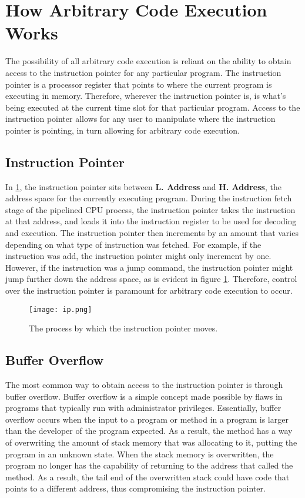 \section{How Arbitrary Code Execution Works}

The possibility of all arbitrary code execution is reliant on the ability to obtain access to the instruction pointer for any particular program. The instruction pointer is a processor register that points to where the current program is executing in memory. Therefore, wherever the instruction pointer is, is what’s being executed at the current time slot for that particular program. Access to the instruction pointer allows for any user to manipulate where the instruction pointer is pointing, in turn allowing for arbitrary code execution. 

\subsection{Instruction Pointer}

In \ref{fig:ip}, the instruction pointer sits between \textbf{L. Address} and \textbf{H. Address}, the address space for the currently executing program. During the instruction fetch stage of the pipelined CPU process, the instruction pointer takes the instruction at that address, and loads it into the instruction register to be used for decoding and execution. The instruction pointer then increments by an amount that varies depending on what type of instruction was fetched. For example, if the instruction was add, the instruction pointer might only increment by one. However, if the instruction was a jump command, the instruction pointer might jump further down the address space, as is evident in figure \ref{fig:ip}. Therefore, control over the instruction pointer is paramount for arbitrary code execution to occur. \cite{instruction_pointer_1999}

\begin{figure}
\texttt{[image: ip.png]}
\caption{The process by which the instruction pointer moves.}
\label{fig:ip}
\end{figure}

\subsection{Buffer Overflow}

The most common way to obtain access to the instruction pointer is through buffer overflow. Buffer overflow is a simple concept made possible by flaws in programs that typically run with administrator privileges. Essentially, buffer overflow occurs when the input to a program or method in a program is larger than the developer of the program expected. As a result, the method has a way of overwriting the amount of stack memory that was allocating to it, putting the program in an unknown state. When the stack memory is overwritten, the program no longer has the capability of returning to the address that called the method. As a result, the tail end of the overwritten stack could have code that points to a different address, thus compromising the instruction pointer.

